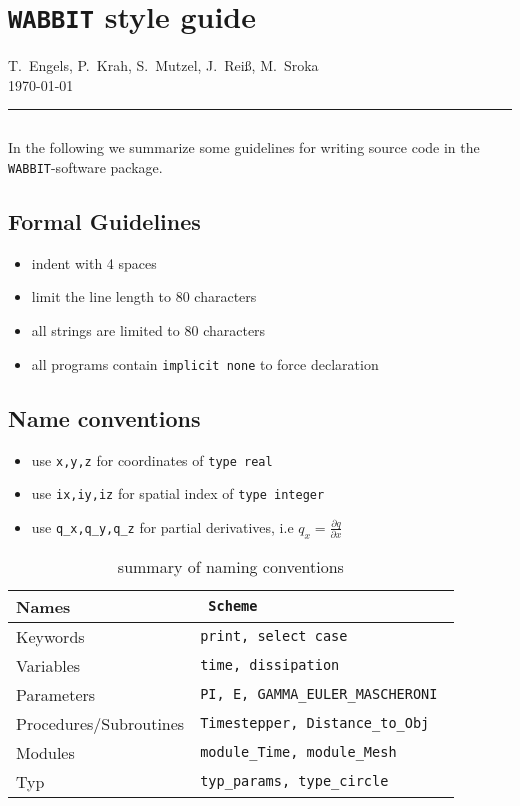 \documentclass[11pt]{article}
\newcommand{\pd}[2]{\frac{\partial #1}{\partial #2}}
\begin{document}
\section*{\texttt{WABBIT} style guide}
T.~Engels, P.~Krah, S.~Mutzel, J.~Rei\ss, M.~Sroka 
\\[1ex] 
\today
\\[2ex]
\hrule$~$

In the following we summarize some guidelines for writing source code in the \texttt{WABBIT}-software package. 
\subsection*{Formal Guidelines}
\begin{itemize}
    \item indent with 4 spaces
	\item limit the line length to 80 characters
	\item all strings are limited to 80 characters
	\item all programs contain \texttt{implicit none} to force declaration
\end{itemize}

\subsection*{Name conventions}
\begin{itemize}
	\item use \texttt{x,y,z} for coordinates of \texttt{type real}
	\item use \texttt{ix,iy,iz} for spatial index of \texttt{type integer}
	\item use \texttt{q\_x,q\_y,q\_z} for partial derivatives, i.e $q_x=\pd{q}{x}$
\end{itemize}

\begin{table}[htp!]
	\caption{summary of naming conventions}
	\label{tab:tablename}
	\centering

	\begin{tabular}{l>{\tt}l}
	\toprule
		\textbf{Names} & \textbf{Scheme} \\
	\midrule
	Keywords				&print, select case \\
	Variables				&time,  dissipation \\
	Parameters				&PI, E, GAMMA\_EULER\_MASCHERONI \\
	Procedures/Subroutines  &Timestepper, Distance\_to\_Obj \\
	Modules  				&module\_Time, module\_Mesh \\
	Typ 					&typ\_params, type\_circle\\
	\bottomrule
	\end{tabular}
\end{table}
\end{document}
